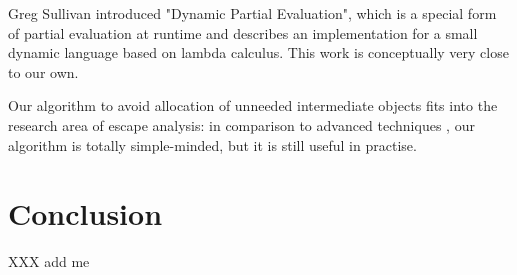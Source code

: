 Greg Sullivan introduced "Dynamic Partial Evaluation", which is a special
form of partial evaluation at runtime \cite{sullivan_dynamic_2001} and describes
an implementation for a small dynamic language based on lambda calculus. This
work is conceptually very close to our own.

Our algorithm to avoid allocation of unneeded intermediate objects fits into
the research area of escape analysis: in comparison to advanced techniques
\cite{Blanchet99escapeanalysis}, \cite{Choi99escapeanalysis} our algorithm is
totally simple-minded, but it is still useful in practise.

\section{Conclusion}

XXX add me

